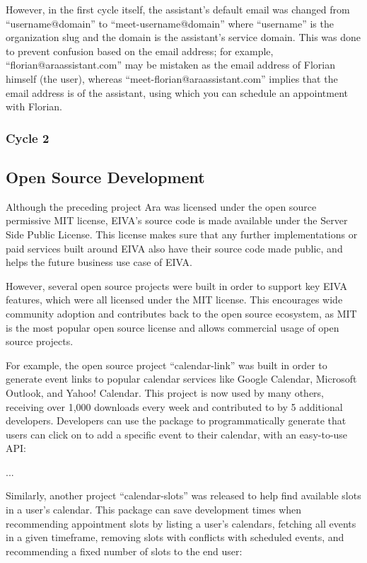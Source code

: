 \documentclass{article}
\begin{document}
However, in the first cycle itself, the assistant’s default email was changed from “username@domain” to “meet-username@domain” where “username” is the organization slug and the domain is the assistant’s service domain. This was done to prevent confusion based on the email address; for example, “florian@araassistant.com” may be mistaken as the email address of Florian himself (the user), whereas “meet-florian@araassistant.com” implies that the email address is of the assistant, using which you can schedule an appointment with Florian.

\subsubsection{Cycle 2}

\subsection{Open Source Development}

Although the preceding project Ara was licensed under the open source permissive MIT license, EIVA’s source code is made available under the Server Side Public License. This license makes sure that any further implementations or paid services built around EIVA also have their source code made public, and helps the future business use case of EIVA.

However, several open source projects were built in order to support key EIVA features, which were all licensed under the MIT license. This encourages wide community adoption and contributes back to the open source ecosystem, as MIT is the most popular open source license and allows commercial usage of open source projects.

For example, the open source project “calendar-link” was built in order to generate event links to popular calendar services like Google Calendar, Microsoft Outlook, and Yahoo! Calendar. This project is now used by many others, receiving over 1,000 downloads every week and contributed to by 5 additional developers. Developers can use the package to programmatically generate that users can click on to add a specific event to their calendar, with an easy-to-use API:

...

Similarly, another project “calendar-slots” was released to help find available slots in a user’s calendar. This package can save development times when recommending appointment slots by listing a user’s calendars, fetching all events in a given timeframe, removing slots with conflicts with scheduled events, and recommending a fixed number of slots to the end user:
\end{document}
